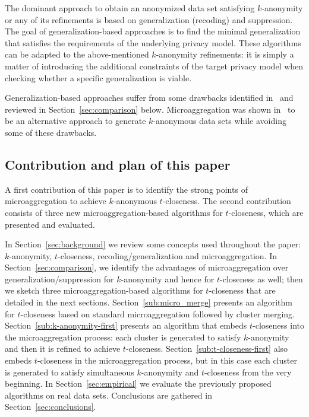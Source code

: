 \documentclass[10pt,journal,compsoc]{IEEEtran}
\theoremstyle{definition}
\theoremstyle{plain}
\begin{document}
The dominant approach to obtain an anonymized
data set satisfying $k$-anonymity or any of its refinements  
is based on generalization (recoding) and suppression. The goal of 
generalization-based approaches is to find the minimal generalization
that satisfies the requirements of the underlying privacy model. 
These algorithms can be adapted to the above-mentioned 
$k$-anonymity refinements: it is simply a matter of introducing
the additional constraints of the target privacy model when checking
whether a specific generalization is viable.

Generalization-based approaches suffer from 
some drawbacks identified in~\cite{Domingo2005Ordinal} and reviewed
in Section~\ref{sec:comparison} below.
Microaggregation was shown in~\cite{Domingo2005Ordinal} 
to be an alternative approach to 
generate $k$-anonymous
data sets while avoiding some of these drawbacks. 


\subsection*{Contribution and plan of this paper}

A first contribution of this paper is to identify the 
strong points of   
microaggregation to achieve $k$-anonymous $t$-closeness.
The second contribution consists of 
three new microaggregation-based algorithms for $t$-closeness, which
are presented and evaluated.
 
In Section~\ref{sec:background}
we review some concepts used throughout the paper: 
$k$-anonymity, $t$-closeness, recoding/generalization and
microaggregation. In Section~\ref{sec:comparison}, we
identify the advantages of microaggregation
over generalization/suppression for $k$-anonymity and hence
for $t$-closeness as well; then we 
sketch three microaggregation-based algorithms for $t$-closeness
that are detailed in the next sections.
Section~\ref{sub:micro_merge} presents an algorithm for 
$t$-closeness based on standard microaggregation followed
by cluster merging. Section~\ref{sub:k-anonymity-first}
presents an algorithm that embeds $t$-closeness into the microaggregation
process: each cluster is generated to satisfy $k$-anonymity and
then it is refined to achieve $t$-closeness.
Section~\ref{sub:t-closeness-first} also embeds $t$-closeness
in the microaggregation process, but in this case each cluster
is generated to satisfy simultaneous $k$-anonymity and $t$-closeness
from the very beginning. 
In Section~\ref{sec:empirical} we evaluate the 
previously proposed algorithms on real data sets. Conclusions
are gathered in Section~\ref{sec:conclusions}.
\end{document}
